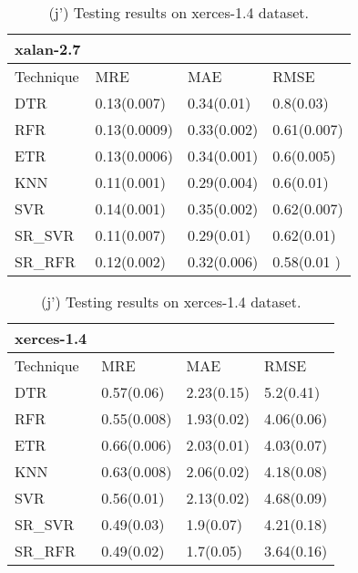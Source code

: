 \documentclass[]{article}
\begin{document}
	\begin{table}[h]
		\captionsetup[subtable]{labelformat=empty}
		\begin{adjustwidth}{-2.9cm}{}
			\begin{subtable}{9cm}
				\centering
				\caption{(i') Testing results on xalan-2.7 dataset.}
				\label{tab:xalan-wv}
				\begin{tabular}{llll}
					\hline
					xalan-2.7 &&&\\ \hline
					Technique & MRE & MAE & RMSE\\  \hline
					DTR & 0.13(0.007) & 0.34(0.01) & 0.8(0.03)\\ 
					RFR & 0.13(0.0009) & 0.33(0.002) & 0.61(0.007)\\ 
					ETR & 0.13(0.0006) & 0.34(0.001) & 0.6(0.005)\\ 
					KNN & 0.11(0.001) & 0.29(0.004) & 0.6(0.01)\\ 
					SVR & 0.14(0.001) & 0.35(0.002) & 0.62(0.007)\\ 
					SR\_SVR & 0.11(0.007) & 0.29(0.01) & 0.62(0.01)\\
					SR\_RFR & 0.12(0.002) & 0.32(0.006) & 0.58(0.01	)\\ \hline
				\end{tabular}
			\end{subtable}
			\begin{subtable}{9cm}
				\centering
				\caption{(j') Testing results on xerces-1.4 dataset.}
				\label{tab:xerces-wv}
				\begin{tabular}{llll}
					\hline
					xerces-1.4 &&&\\ \hline
					Technique & MRE & MAE & RMSE\\  \hline
					DTR & 0.57(0.06) & 2.23(0.15) & 5.2(0.41)\\ 
					RFR & 0.55(0.008) & 1.93(0.02) & 4.06(0.06)\\ 
					ETR & 0.66(0.006) & 2.03(0.01) & 4.03(0.07)\\ 
					KNN & 0.63(0.008) & 2.06(0.02) & 4.18(0.08)\\ 
					SVR & 0.56(0.01) & 2.13(0.02) & 4.68(0.09)\\ 
					SR\_SVR & 0.49(0.03) & 1.9(0.07) & 4.21(0.18)\\
					SR\_RFR & 0.49(0.02) & 1.7(0.05) & 3.64(0.16)\\ \hline
				\end{tabular}
			\end{subtable} 
		\end{adjustwidth}
	\end{table}
	
\end{document}
